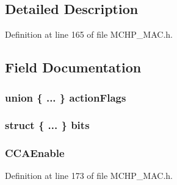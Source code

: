 \subsection{Detailed Description}


Definition at line 165 of file M\+C\+H\+P\+\_\+\+M\+A\+C.\+h.



\subsection{Field Documentation}
\hypertarget{struct_m_a_c_i_n_i_t___p_a_r_a_m_a43d124e86f5f26774af4909e6b12e776}{}
\subsubsection[{action\+Flags}]{\setlength{\rightskip}{0pt plus 5cm}union \{ ... \}   action\+Flags}\label{struct_m_a_c_i_n_i_t___p_a_r_a_m_a43d124e86f5f26774af4909e6b12e776}
\hypertarget{struct_m_a_c_i_n_i_t___p_a_r_a_m_a33c13c1cb6c3f879a1a7f0aa1a608251}{}
\subsubsection[{bits}]{\setlength{\rightskip}{0pt plus 5cm}struct \{ ... \}   bits}\label{struct_m_a_c_i_n_i_t___p_a_r_a_m_a33c13c1cb6c3f879a1a7f0aa1a608251}
\hypertarget{struct_m_a_c_i_n_i_t___p_a_r_a_m_aed3546fd4913ed50a8a8a07f9035dc9b}{}
\subsubsection[{C\+C\+A\+Enable}]{ C\+C\+A\+Enable}\label{struct_m_a_c_i_n_i_t___p_a_r_a_m_aed3546fd4913ed50a8a8a07f9035dc9b}


Definition at line 173 of file M\+C\+H\+P\+\_\+\+M\+A\+C.\+h.

